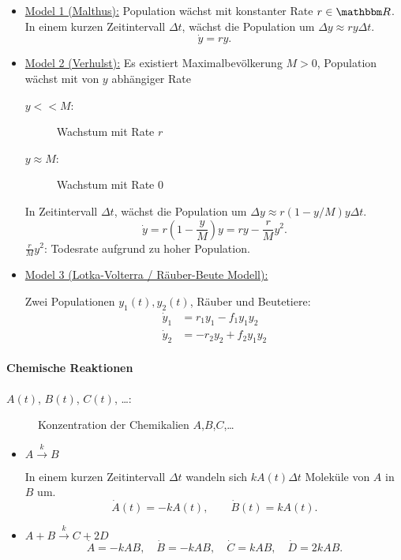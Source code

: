 \documentclass[12pt,a4paper]{book}
\theoremstyle{break}
\theoremstyle{nonumberplain}
\newcommand{\R}{\mathbbm R}
\newcommand{\1}{\mathbbm{1}} 			      	%
\begin{document}
\begin{itemize}
\item \underline{Model 1 (Malthus):} Population wächst mit konstanter Rate $r\in \R$. 
In einem kurzen Zeitintervall $\Delta t$, wächst die Population um $\Delta y \approx r y \Delta t$.
\[
\dot y=r y.
\]

\item \underline{Model 2 (Verhulst):} Es existiert Maximalbevölkerung $M>0$, Population wächst mit von $y$ abhängiger Rate
\begin{description}
\item[$y<<M $:] Wachstum mit Rate $r$
\item[$y\approx M$:] Wachstum mit Rate $0$
\end{description}
In Zeitintervall $\Delta t$, wächst die Population um $\Delta y \approx r (1-y/M) y \Delta t$.
\[
\dot y=r\left( 1- \frac{y}{M} \right) y=r y - \frac{r}{M} y^2.
\]
$\frac{r}{M} y^2$: Todesrate aufgrund zu hoher Population.
%
\item \underline{Model 3 (Lotka-Volterra / Räuber-Beute Modell):}

Zwei Populationen $y_1(t), y_2(t)$, Räuber und Beutetiere:
\begin{align*}
\dot y_1 &= r_1 y_1 - f_1 y_1 y_2\\
\dot y_2 &= - r_2 y_2  + f_2 y_1 y_2
\end{align*}
\end{itemize}
%
\paragraph{Chemische Reaktionen}

\begin{description}
\item[$A(t)$, $B(t)$, $C(t)$, \ldots:] Konzentration der Chemikalien $A$,$B$,$C$,\ldots 
\end{description}

\begin{itemize}
\item $A \stackrel{k}{\longrightarrow} B$

In einem kurzen Zeitintervall $\Delta t$ wandeln sich $kA(t) \Delta t$ Moleküle von $A$ in $B$ um.
\[
\dot A(t)=-kA(t), \qquad \dot B(t)=kA(t).
\]

\item $A  + B \stackrel{k}{\longrightarrow} C + 2D$
\[
\dot A=-kA B, \quad \dot B=-kAB, \quad \dot C=kAB, \quad \dot D=2kAB.
\]
\end{itemize}
%
\end{document}
